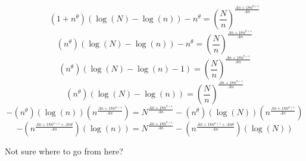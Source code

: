 \documentclass{article}
\newcommand{\aadit}[1]{\begingroup\color{orange}#1\endgroup}
\begin{document}
\begin{equation}
(1 + n^\theta) (\log(N) - \log(n)) - n^\theta = \left( \frac{N}{n} \right)^{\frac{A n + 18 n^{\theta + 1}}{A n}}
\end{equation}
\begin{equation}
(n^\theta) (\log(N) - \log(n)) - n^\theta = \left( \frac{N}{n} \right)^{\frac{A n + 18 n^{\theta + 1}}{A n}}
\end{equation}
\begin{equation}
(n^\theta) (\log(N) - \log(n) - 1) = \left( \frac{N}{n} \right)^{\frac{A n + 18 n^{\theta + 1}}{A n}}
\end{equation}
\begin{equation}
(n^\theta) (\log(N) - \log(n)) = \left( \frac{N}{n} \right)^{\frac{A n + 18 n^{\theta + 1}}{A n}}
\end{equation}
\begin{equation}
-(n^\theta) ( \log(n)) (n^{\frac{A n + 18 n^{\theta + 1}}{A n}}) = N ^{\frac{A n + 18 n^{\theta + 1}}{A n}} - (n^\theta) ( \log(N)) (n^{\frac{A n + 18 n^{\theta + 1}}{A n}})
\end{equation}
\begin{equation}
-(n^{\frac{A n + 18 n^{\theta + 1} + An\theta}{A n}}) ( \log(n))  = N ^{\frac{A n + 18 n^{\theta + 1}}{A n}} - (n^{\frac{A n + 18 n^{\theta + 1} + An\theta}{A n}}) ( \log(N))
\end{equation}

\aadit{Not sure where to go from here?} \\\\
\end{document}
